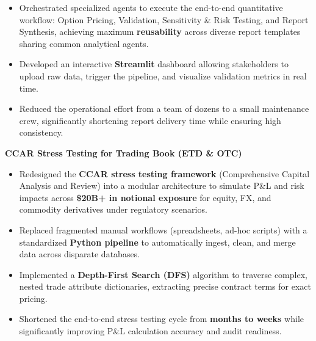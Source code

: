 \begin{cventries}
{\begin{cvitems}
\begin{itemize}
{            Built a \textbf{multi-agent system} using \textbf{LangGraph} to 
            automate Ongoing Performance Assessment (OPA) reporting, 
            eliminating heavy manual documentation.
          }
          \item {
            Orchestrated specialized agents to execute the end-to-end quantitative workflow: 
            {Option Pricing}, {Validation}, 
            {Sensitivity \& Risk Testing}, and {Report Synthesis}, 
            achieving maximum \textbf{reusability} across diverse report templates 
            sharing common analytical agents.
          }
          \item {
            Developed an interactive \textbf{Streamlit} dashboard allowing stakeholders to upload raw data, 
            trigger the pipeline, and visualize validation metrics in real time.
          }
          \item {
            Reduced the operational effort from a team of dozens to a small maintenance crew, 
            significantly shortening report delivery time while ensuring high consistency.
          }
        \end{itemize}
      \vspace{0.5mm}
      \item {\textbf{CCAR Stress Testing for Trading Book (ETD \& OTC)}}
        \begin{itemize}
          \item {
            Redesigned the \textbf{CCAR stress testing framework} 
            (Comprehensive Capital Analysis and Review) into a modular architecture 
            to simulate P\&L and risk impacts across \textbf{\$20B+ in notional exposure} for equity, FX, and commodity derivatives 
            under regulatory scenarios.
          }
          \item {
            Replaced fragmented manual workflows (spreadsheets, ad-hoc scripts) with 
            a standardized \textbf{Python pipeline} to automatically 
            ingest, clean, and merge data across disparate databases.
          }
          \item {
            Implemented a \textbf{Depth-First Search (DFS)} algorithm to traverse complex, 
            nested trade attribute dictionaries, extracting precise contract terms for exact pricing.
          }
          \item {
            Shortened the end-to-end stress testing cycle from \textbf{months to weeks} 
            while significantly improving P\&L calculation accuracy and audit readiness.
}
\end{itemize}
\end{cvitems}}
\end{cventries}
